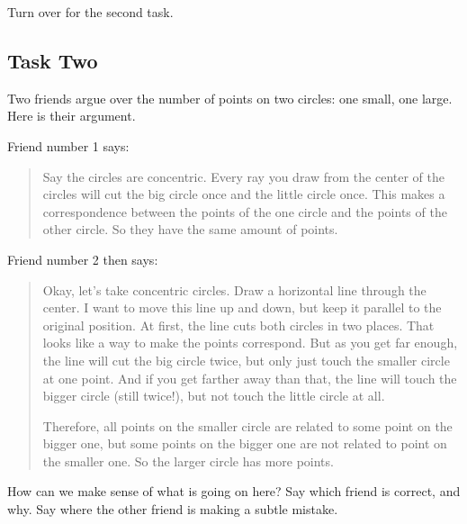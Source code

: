 \documentclass[12pt,letterpaper]{article}
\begin{document}
{\small Turn over for the second task.}

\clearpage
\subsection*{Task Two}


Two friends argue over the number of points on two circles: one small, one large.
Here is their argument.

Friend number 1 says:
\begin{quote}
Say the circles are concentric. 
Every ray you draw from the center of the circles will cut the big circle once and the little circle once. 
This makes a correspondence between the points of the one circle and the points of the other circle.
So they have the same amount of points.
\end{quote}

Friend number 2 then says:
\begin{quotation}
Okay, let's take concentric circles. Draw a horizontal line through the center.
I want to move this line up and down, but keep it parallel to the original position.
At first, the line cuts both circles in two places. 
That looks like a way to make the points correspond.
But as you get far enough, the line will cut the big circle twice, but only just touch the smaller circle at one point. 
And if you get farther away than that, the line will touch the bigger circle (still twice!), but not touch the little circle at all.

Therefore, all points on the smaller circle are related to some point on the bigger one, but some points on the bigger one are not related to point on the smaller one.
So the larger circle has more points.
\end{quotation}

How can we make sense of what is going on here? Say which friend is correct, and why. Say where the other friend is making a subtle mistake.
\vspace{.1cm}
\begin{center}
\end{center}
\end{document}
